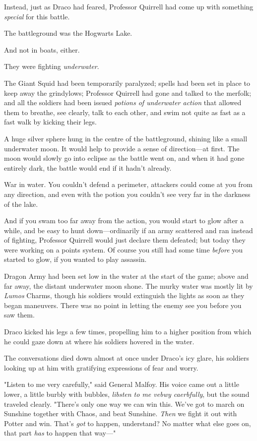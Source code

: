 Instead, just as Draco had feared, Professor Quirrell had come up with
something \emph{special} for this battle.

The battleground was the Hogwarts Lake.

And not in boats, either.

They were fighting \emph{underwater}.

The Giant Squid had been temporarily paralyzed; spells had been set in place to
keep away the grindylows; Professor Quirrell had gone and talked to the
merfolk; and all the soldiers had been issued \emph{potions of underwater
action} that allowed them to breathe, see clearly, talk to each other, and swim
not quite as fast as a fast walk by kicking their legs.

A huge silver sphere hung in the centre of the battleground, shining like a
small underwater moon. It would help to provide a sense of direction---at
first. The moon would slowly go into eclipse as the battle went on, and when it
had gone entirely dark, the battle would end if it hadn't already.

War in water. You couldn't defend a perimeter, attackers could come at you from
any direction, and even with the potion you couldn't see very far in the
darkness of the lake.

And if you swam too far away from the action, you would start to glow after a
while, and be easy to hunt down---ordinarily if an army scattered and ran
instead of fighting, Professor Quirrell would just declare them defeated; but
today they were working on a points system. Of course you still had some time
\emph{before} you started to glow, if you wanted to play assassin.

Dragon Army had been set low in the water at the start of the game; above and
far away, the distant underwater moon shone. The murky water was mostly lit by
\emph{Lumos} Charms, though his soldiers would extinguish the lights as soon as
they began maneuvers. There was no point in letting the enemy see you before
you saw them.

Draco kicked his legs a few times, propelling him to a higher position from
which he could gaze down at where his soldiers hovered in the water.

The conversations died down almost at once under Draco's icy glare, his
soldiers looking up at him with gratifying expressions of fear and worry.

"Listen to me very carefully," said General Malfoy. His voice came out a little
lower, a little burbly with bubbles, \emph{libsten to me vebwy caerbfully}, but
the sound traveled clearly. "There's only one way we can win this. We've got to
march on Sunshine together with Chaos, and beat Sunshine. \emph{Then} we fight
it out with Potter and win. That's \emph{got} to happen, understand? No matter
what else goes on, that part \emph{has} to happen that way---"

